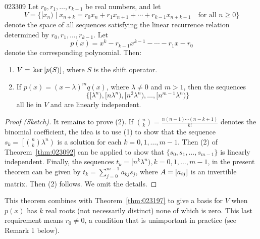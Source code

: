 \begin{theorem}{}{023309}
Let $r_{0}, r_{1}, \dots, r_{k-1}$ be real numbers, and let
\begin{equation*}
V = \{[x_n) \mid  x_{n+k} = r_{0}x_n + r_{1}x_{n+1} + \cdots + r_{k-1}x_{n+k-1} \quad \mbox{for all } n \geq 0\}
\end{equation*}
denote the space of all sequences satisfying the linear recurrence relation determined by $r_{0}, r_{1}, \dots, r_{k-1}$. Let
\begin{equation*}
p(x) = x^k - r_{k-1}x^{k-1} - \cdots - r_{1}x - r_0
\end{equation*}
denote the corresponding polynomial. Then:


\begin{enumerate}
\item $V = \thinspace\operatorname{ker\medspace}[p(S)]$, where $S$ is the shift operator.

\item If $p(x) = (x - \lambda)^{m}q(x)$, where $\lambda \neq 0$ and $m > 1$, then the sequences
\begin{equation*}
\{[\lambda^n), [n\lambda^n), [n^2\lambda^n), \dots, [n^{m-1}\lambda^n)\}
\end{equation*}
all lie in $V$ and are linearly independent.

\end{enumerate}
\end{theorem}
\vspace{-0.5em}
\begin{proof}[Proof (Sketch)]
 It remains to prove (2). If $\binom{n}{k} = \frac{n(n - 1) \cdots (n - k + 1)}{k!}$ denotes the binomial coefficient, the idea is to use (1) to show that the sequence $s_k = \left[\binom{n}{k} \lambda^n \right)$ is a solution for each $k = 0, 1, \dots, m - 1$. Then (2) of Theorem~\ref{thm:023092} can be applied to show that $\{s_{0}, s_{1}, \dots, s_{m-1}\}$ is linearly independent. Finally, the sequences $t_{k} = [n^{k}\lambda^{n}), k = 0, 1, \dots, m - 1$, in the present theorem can be given by $t_k = \sum_{j=0}^{m-1} a_{kj}s_{j}$, where $A = \left[ a_{ij} \right]$ is an invertible matrix. Then (2) follows. We omit the details.
\end{proof}

This theorem combines with Theorem~\ref{thm:023197} to give a basis for $V$ when $p(x)$ has $k$ real roots (not necessarily distinct) none of which is zero. This last requirement means $r_{0} \neq 0$, a condition that is unimportant in practice (see Remark 1 below).


